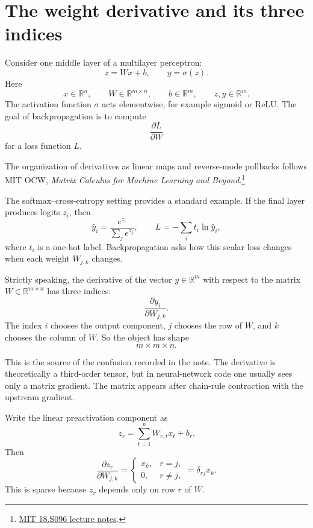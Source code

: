 
\section{The weight derivative and its three indices}

Consider one middle layer of a multilayer perceptron:
\[
  z=Wx+b,\qquad y=\sigma(z).
\]
Here
\[
  x\in\mathbb R^n,\qquad
  W\in\mathbb R^{m\times n},\qquad
  b\in\mathbb R^m,\qquad
  z,y\in\mathbb R^m.
\]
The activation function $\sigma$ acts elementwise, for example sigmoid or ReLU.  The goal of backpropagation is to compute
\[
  \frac{\partial L}{\partial W}
\]
for a loss function $L$.

The organization of derivatives as linear maps and reverse-mode pullbacks follows MIT OCW, \emph{Matrix Calculus for Machine Learning and Beyond}.\footnote{\href{https://ocw.mit.edu/courses/18-s096-matrix-calculus-for-machine-learning-and-beyond-january-iap-2023/pages/lecture-notes-and-readings/}{MIT 18.S096 lecture notes}.}

The softmax--cross-entropy setting provides a standard example.  If the final layer produces logits $z_i$, then
\[
  \hat y_i=\frac{e^{z_i}}{\sum_j e^{z_j}},\qquad
  L=-\sum_i t_i\ln \hat y_i,
\]
where $t_i$ is a one-hot label.  Backpropagation asks how this scalar loss changes when each weight $W_{j,k}$ changes.

Strictly speaking, the derivative of the vector $y\in\mathbb R^m$ with respect to the matrix $W\in\mathbb R^{m\times n}$ has three indices:
\[
  \frac{\partial y_i}{\partial W_{j,k}}.
\]
The index $i$ chooses the output component, $j$ chooses the row of $W$, and $k$ chooses the column of $W$.  So the object has shape
\[
  m\times m\times n.
\]

This is the source of the confusion recorded in the note.  The derivative is theoretically a third-order tensor, but in neural-network code one usually sees only a matrix gradient.  The matrix appears after chain-rule contraction with the upstream gradient.

Write the linear preactivation component as
\[
  z_r=\sum_{t=1}^n W_{r,t}x_t+b_r.
\]
Then
\[
  \frac{\partial z_r}{\partial W_{j,k}}
  =
  \begin{cases}
  x_k,&r=j,\\
  0,&r\ne j,
  \end{cases}
  =\delta_{rj}x_k.
\]
This is sparse because $z_r$ depends only on row $r$ of $W$.

